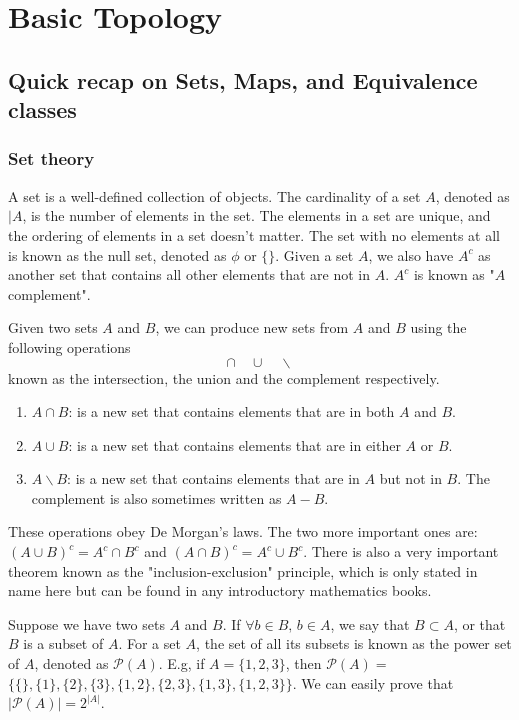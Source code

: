 \chapter{Basic Topology}
  \label{chapter:Basic Topology}
    \section{Quick recap on Sets, Maps, and Equivalence classes}
      \subsection*{Set theory}
        A set is a well-defined collection of objects. The cardinality of a
        set $A$, denoted as $|A$, is the number of elements in the set. The
        elements in a set are unique, and the ordering of elements in a set
        doesn't matter. The set with no elements at all is known as the null
        set, denoted as $\phi$ or $\{\}$. Given a set $A$, we also have $A^c$
        as another set that contains all other elements that are not in $A$.
        $A^c$ is known as "$A$ complement".

        Given two sets $A$ and $B$, we can produce new sets from $A$ and $B$
        using the following operations \[\cap \quad \cup \quad \backslash \]
        known as the intersection, the union and the complement respectively.
        \begin{enumerate}
          \item{$A\cap B$: is a new set that contains elements that are in
          both $A$ and $B$.}
          \item{$A\cup B$: is a new set that contains elements that are in
          either $A$ or $B$.}
          \item{$A \backslash B$: is a new set that contains elements that
          are in $A$ but not in $B$. The complement is also sometimes written
          as $A - B$.}
        \end{enumerate}
        These operations obey De Morgan's laws. The two more important ones
        are: $(A \cup B)^c = A^c \cap B^c$ and $(A \cap B)^c = A^c \cup B^c$.
        There is also a very important theorem known as the
        "inclusion-exclusion" principle, which is only stated in name here
        but can be found in any introductory mathematics books.

        Suppose we have two sets $A$ and $B$. If $\forall b \in B,\, b \in
        A$, we say that $B \subset A$, or that $B$ is a subset of $A$. For a
        set $A$, the set of all its subsets is known as the power set of $A$,
        denoted as $\mathcal{P}(A)$. E.g, if $A = \{1,2,3\}$, then
        $\mathcal{P}(A) =$ $\{ \{\}, \{1\}, \{2\}, \{3\}, \{1,2\},
        \{2,3\},\{1,3\},\{1,2,3\}\}$. We can easily prove that
        $|\mathcal{P}(A)|=2^{|A|}$.


